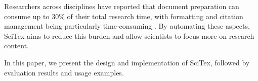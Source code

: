 
Researchers across disciplines have reported that document preparation can consume up to 30\% of their total research time, with formatting and citation management being particularly time-consuming \cite{Lee2018}. By automating these aspects, SciTex aims to reduce this burden and allow scientists to focus more on research content.

In this paper, we present the design and implementation of SciTex, followed by evaluation results and usage examples.

